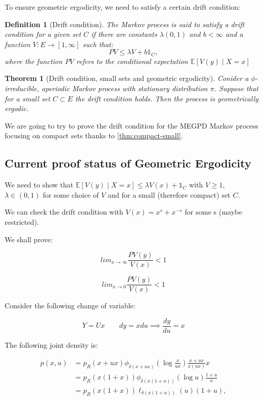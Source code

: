 \documentclass{article}
\newtheorem{definition}{Definition}[section]
\newtheorem{theorem}[theorem]{Theorem}
\begin{document}
To ensure geometric ergodicity, we need to satisfy a certain drift condition:

\begin{definition}[Drift condition]
  The Markov process is said to satisfy a drift condition for a given set $C$ if there are constants $\lambda (0, 1)$ and $b < \infty$ and a function $V: E \to [1, \infty]$ such that:
  \[
    PV \leq \lambda V + b \mathds{1}_C ,
  \]
  where the function $PV$ refers to the conditional expectation $\mathbb{E}\left[V(y) \mid X = x\right]$
\end{definition}

\begin{theorem}[Drift condition, small sets and geometric ergodicity]
  Conider a $\phi$-irreducible, aperiodic Markov process with stationary distribution $\pi$. Suppose that for a small set $C \subset E$ the drift condition holds. Then the process is geometrically ergodic.
\end{theorem}

We are going to try to prove the drift condition for the MEGPD Markov process focusing on compact sets thanks to \cref{thm:compact-small}.

\subsection{Current proof status of Geometric Ergodicity}

We need to show that $\mathbb{E}[V(y) \mid X = x] \leq \lambda V(x) + \mathds{1}_C$ with $V \geq 1$, $\lambda \in (0, 1)$ for some choice of $V$ and for a small (therefore compact) set $C$.

We can check the drift condition with $V(x) = x^s + x^{-s}$ for some s (maybe restricted).

We shall prove:

\[
lim_{x \to \infty} \frac{PV(y)}{V(x)} < 1
\]

\[
lim_{x \to 0} \frac{PV(y)}{V(x)} < 1
\]

Consider the following change of variable:

\[
Y = U x \quad \quad dy = x du \implies \frac{dy}{du} = x
\]

The following joint density is:

\begin{align*}
  p(x, u) &= p_R(x + ux) \phi_{\delta(x + ux)}(\log \frac{x}{ux}) \frac{x + ux}{x(ux)} x \\
          &= p_R(x(1+x)) \phi_{\delta(x(1+u))}(\log u) \frac{1+u}{u} \\
          &= p_R(x(1+x)) \ell_{\delta(x(1+u))}(u) (1+u),
\end{align*}
\end{document}

